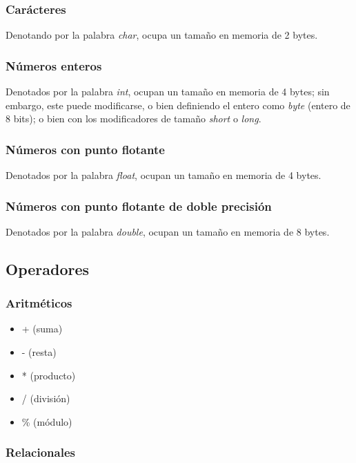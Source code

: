 \documentclass[12pt]{article}
\begin{document}
\subsubsection{Car\'acteres}
Denotando por la palabra \textit{char}, ocupa un tama\~no en memoria de 2 bytes.

\subsubsection{N\'umeros enteros}
Denotados por la palabra \textit{int}, ocupan un tama\~no en memoria de 4 bytes; sin embargo, este puede modificarse, o bien definiendo el entero como \textit{byte} (entero de 8 bits); o bien con los modificadores de tamaño \textit{short} o \textit{long}.

\subsubsection{N\'umeros con punto flotante}
Denotados por la palabra \textit{float}, ocupan un tama\~no en memoria de 4 bytes.

\subsubsection{N\'umeros con punto flotante de doble precisi\'on}
Denotados por la palabra \textit{double}, ocupan un tama\~no en memoria de 8 bytes.

\subsection{Operadores}

\subsubsection{Aritm\'eticos}

\begin{itemize}
\item + (suma)
\item - (resta)
\item * (producto)
\item / (divisi\'on)
\item \% (m\'odulo)
\end{itemize}

\subsubsection{Relacionales}
\end{document}
